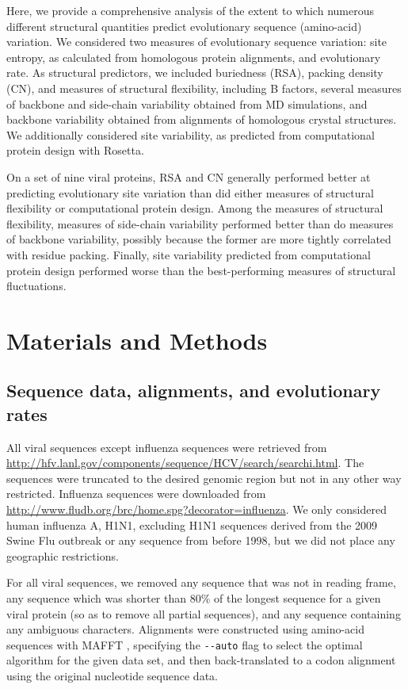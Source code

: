 \documentclass[smallextended]{svjour3}
\begin{document}
Here, we provide a comprehensive analysis of the extent to which numerous different structural quantities predict evolutionary sequence (amino-acid) variation. We considered two measures of evolutionary sequence variation: site entropy, as calculated from homologous protein alignments, and evolutionary rate. As structural predictors, we included buriedness (RSA), packing density (CN), and measures of structural flexibility, including B factors, several measures of backbone and side-chain variability obtained from MD simulations, and backbone variability obtained from alignments of homologous crystal structures. We additionally considered site variability, as predicted from computational protein design with Rosetta. 

On a set of nine viral proteins, RSA and CN generally performed better at predicting evolutionary site variation than did either measures of structural flexibility or computational protein design. Among the measures of structural flexibility, measures of side-chain variability performed better than do measures of backbone variability, possibly because the former are more tightly correlated with residue packing. Finally, site variability predicted from computational protein design performed worse than the best-performing measures of structural fluctuations.

\section*{Materials and Methods}

\subsection*{Sequence data, alignments, and evolutionary rates}

All viral sequences except influenza sequences were retrieved from \url{http://hfv.lanl.gov/components/sequence/HCV/search/searchi.html}.
The sequences were truncated to the desired genomic region but not in any other way restricted. Influenza sequences were downloaded from \url{http://www.fludb.org/brc/home.spg?decorator=influenza}. We only considered human influenza A, H1N1, excluding H1N1 sequences derived from the 2009 Swine Flu outbreak or any sequence from before 1998, but we did not place any geographic restrictions.

For all viral sequences, we removed any sequence that was not in reading frame, any sequence which was shorter than 80\% of the longest sequence for a given viral protein (so as to remove all partial sequences), and any sequence containing any ambiguous characters. Alignments were constructed using amino-acid sequences with MAFFT \citep{Katohetal2002,Katohetal2005}, specifying the \verb+--auto+ flag to select the optimal algorithm for the given data set, and then back-translated to a codon alignment using the original nucleotide sequence data.
\end{document}
